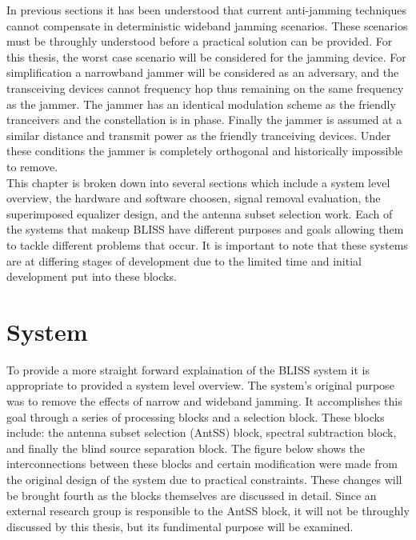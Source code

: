 In previous sections it has been understood that current anti-jamming techniques cannot compensate in deterministic wideband jamming scenarios.  These scenarios must be throughly understood before a practical solution can be provided.  For this thesis, the worst case scenario will be considered for the jamming device.  For simplification a narrowband jammer will be considered as an adversary, and the transceiving devices cannot frequency hop thus remaining on the same frequency as the jammer.  The jammer has an identical modulation scheme as the friendly tranceivers and the constellation is in phase.  Finally the jammer is assumed at a similar distance and transmit power as the friendly tranceiving devices.  Under these conditions the jammer is completely orthogonal and historically impossible to remove.\\

This chapter is broken down into several sections which include a system level overview, the hardware and software choosen, signal removal evaluation, the superimposed equalizer design, and the antenna subset selection work.  Each of the systems that makeup BLISS have different purposes and goals allowing them to tackle different problems that occur.  It is important to note that these systems are at differing stages of development due to the limited time and initial development put into these blocks.\\ 

\section{System}

To provide a more straight forward explaination of the BLISS system it is appropriate to provided a system level overview.  The system's original purpose was to remove the effects of narrow and wideband jamming.  It accomplishes this goal through a series of processing blocks and a selection block.  These blocks include: the antenna subset selection (AntSS) block, spectral subtraction block, and finally the blind source separation block.  The figure below shows the interconnections between these blocks and certain modification were made from the original design of the system due to practical constraints.  These changes will be brought fourth as the blocks themselves are discussed in detail. Since an external research group is responsible to the AntSS block, it will not be throughly discussed by this thesis, but its fundimental purpose will be examined.\\


